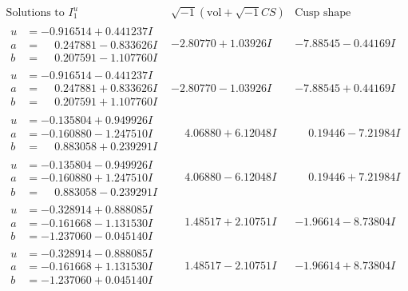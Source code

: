 \documentclass[1p]{elsarticle_modified}
\theoremstyle{definition}
\newcommand{\I}{\sqrt{-1}}
\begin{document}
$$\begin{array}{c|c|c}  
\text{Solutions to }I^u_{1}& \I (\text{vol} + \sqrt{-1}CS) & \text{Cusp shape}\\
 \hline 
\begin{aligned}
u &= -0.916514 + 0.441237 I \\
a &= \phantom{-}0.247881 - 0.833626 I \\
b &= \phantom{-}0.207591 - 1.107760 I\end{aligned}
 & -2.80770 + 1.03926 I & -7.88545 - 0.44169 I \\ \hline\begin{aligned}
u &= -0.916514 - 0.441237 I \\
a &= \phantom{-}0.247881 + 0.833626 I \\
b &= \phantom{-}0.207591 + 1.107760 I\end{aligned}
 & -2.80770 - 1.03926 I & -7.88545 + 0.44169 I \\ \hline\begin{aligned}
u &= -0.135804 + 0.949926 I \\
a &= -0.160880 - 1.247510 I \\
b &= \phantom{-}0.883058 + 0.239291 I\end{aligned}
 & \phantom{-}4.06880 + 6.12048 I & \phantom{-}0.19446 - 7.21984 I \\ \hline\begin{aligned}
u &= -0.135804 - 0.949926 I \\
a &= -0.160880 + 1.247510 I \\
b &= \phantom{-}0.883058 - 0.239291 I\end{aligned}
 & \phantom{-}4.06880 - 6.12048 I & \phantom{-}0.19446 + 7.21984 I \\ \hline\begin{aligned}
u &= -0.328914 + 0.888085 I \\
a &= -0.161668 - 1.131530 I \\
b &= -1.237060 - 0.045140 I\end{aligned}
 & \phantom{-}1.48517 + 2.10751 I & -1.96614 - 8.73804 I \\ \hline\begin{aligned}
u &= -0.328914 - 0.888085 I \\
a &= -0.161668 + 1.131530 I \\
b &= -1.237060 + 0.045140 I\end{aligned}
 & \phantom{-}1.48517 - 2.10751 I & -1.96614 + 8.73804 I \\ \hline\begin{aligned}

\end{aligned}
\end{array}$$
\end{document}
